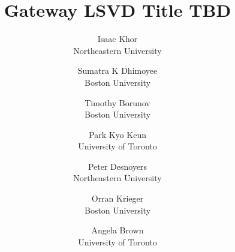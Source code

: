 \documentclass[letterpaper,twocolumn,10pt]{article}
\begin{document}
\date{}

\title{\Large \bf
	Gateway LSVD Title TBD\\}

\author{
	{\rm Isaac Khor}\\
	Northeastern University
	\and
	{\rm Sumatra K Dhimoyee}\\
	Boston University
	\and
	{\rm Timothy Borunov}\\
	Boston University
    \and
	{\rm Park Kyo Keun}\\
	University of Toronto
	\and
	{\rm Peter Desnoyers}\\
	Northeastern University
	\and
	{\rm Orran Krieger}\\
	Boston University
    \and
	{\rm Angela Brown}\\
    University of Toronto
}

\maketitle















\end{document}
